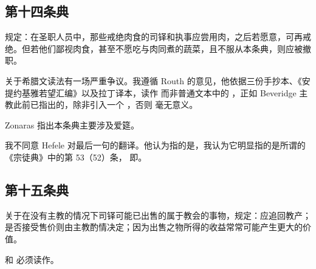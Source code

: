 
\subsection{第十四条典}

规定：在圣职人员中，那些戒绝肉食的司铎和执事应尝用肉，之后若愿意，可再戒绝。但若他们鄙视肉食，甚至不愿吃与肉同煮的蔬菜，且不服从本条典，则应被撤职。\par

关于希腊文读法有一场严重争议。我遵循 Routh 的意见，他依据三份手抄本、《安提约基雅若望汇编》以及拉丁译本，读作  而非普通文本中的 ，正如 Beveridge 主教此前已指出的，除非引入一个 ，否则  毫无意义。\par

Zonaras 指出本条典主要涉及爱筵。\par

我不同意 Hefele 对最后一句的翻译。他认为指的是，我认为它明显指的是所谓的《宗徒典》中的第 53（52）条， 即。\par


\subsection{第十五条典}

关于在没有主教的情况下司铎可能已出售的属于教会的事物，规定：应追回教产；是否接受售价则由主教酌情决定；因为出售之物所得的收益常常可能产生更大的价值。\par

 和  必须读作。\par


